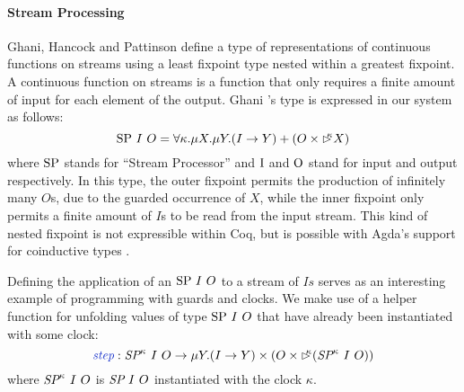 \paragraph{Stream Processing}

Ghani, Hancock and Pattinson \cite{ghani09representations} define a
type of representations of continuous functions on streams using a
least fixpoint type nested within a greatest fixpoint. A continuous
function on streams is a function that only requires a finite amount
of input for each element of the output. Ghani \etal's type is
expressed in our system as follows:
\begin{displaymath}
  \textrm{SP}~I~O = \forall \kappa. \mu X. \mu Y. (I \to Y) + (O \times \mathord{\rhd\kern-0.4em^{\kappa}} X)
\end{displaymath}
where $\textrm{SP}$ stands for ``Stream Processor'' and $\textrm{I}$
and $\textrm{O}$ stand for input and output respectively. In this
type, the outer fixpoint permits the production of infinitely many
$O$s, due to the guarded occurrence of $X$, while the inner fixpoint
only permits a finite amount of $I$s to be read from the input
stream. This kind of nested fixpoint is not expressible within Coq,
but is possible with Agda's support for coinductive types
\cite{danielsson09mixing}.

Defining the application of an $\textrm{SP}~I~O$ to a stream of $Is$
serves as an interesting example of programming with guards and
clocks. We make use of a helper function for unfolding values of type
$\textrm{SP}~I~O$ that have already been instantiated with some clock:
\begin{displaymath}
  \defn{step} : \ident{SP}^\kappa~I~O \to \mu Y. (I \to Y) \times (O \times \delay\kappa(\ident{SP}^\kappa~I~O))
\end{displaymath}
where $\textit{SP}^\kappa~I~O$ is $\textit{SP}~I~O$ instantiated with
the clock $\kappa$.

